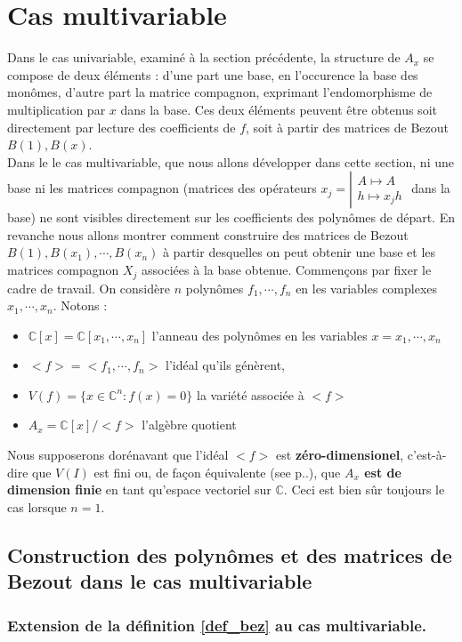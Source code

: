 \documentclass{article}
\theoremstyle{plain}%
\theoremstyle{definition}
\theoremstyle{remark}
\newcommand{\C}{\mathbb{C}}
\begin{document}
\section{Cas multivariable}
Dans le cas univariable, examiné à la section précédente, la structure de $A_x$ se compose de deux éléments : d'une part une base, en l'occurence la base des monômes, d'autre part la matrice compagnon, exprimant l'endomorphisme de multiplication par $x$ dans la base. Ces deux éléments peuvent être obtenus soit directement par lecture des coefficients de $f$, soit à partir des matrices de Bezout $B(1), B(x)$. \\
Dans le le cas multivariable, que nous allons développer dans cette section, ni une base ni les matrices compagnon
(matrices des opérateurs
$x_j = \left\vert
\begin{array}{c}
A \mapsto A \\
h \mapsto x_jh
\end{array}
\right.$ dans la base) ne sont visibles directement sur les coefficients des polynômes de départ. En revanche nous allons montrer comment construire des matrices de Bezout $B(1), B(x_1), \cdots, B(x_n)$ à partir desquelles on peut obtenir une base et les matrices compagnon $X_j$ associées à la base obtenue. Commençons par fixer le cadre de travail.
On considère $n$ polynômes $f_1,\cdots, f_n$ en les variables complexes $x_1,\cdots, x_n$. Notons :
\begin{itemize}
\item $\C[x] = \C[x_1,\cdots, x_n]$ l'anneau des polynômes en les variables $x = x_1,\cdots, x_n$
\item $<f> = <f_1,\cdots, f_n>$ l'idéal qu'ils génèrent,
\item $V(f) = \{x \in \C^n : f(x) = 0\}$ la variété associée à $<f>$
\item $A_x = \C[x]/<f>$ l'algèbre quotient
\end{itemize}
Nous supposerons dorénavant que l'idéal $<f>$ est {\bf zéro-dimensionel},
c'est-à-dire que $V(I)$ est fini ou, de façon équivalente  (see \cite{clo} p..), que {\bf $A_x$ est de dimension finie} en tant qu'espace vectoriel sur $\C$. Ceci est bien sûr toujours le cas lorsque $n = 1$.

\subsection{Construction des polynômes et des matrices de Bezout dans le cas multivariable}

\subsubsection{Extension de la définition \ref{def_bez} au cas multivariable.}
\label{def_bez_multi}
\end{document}
